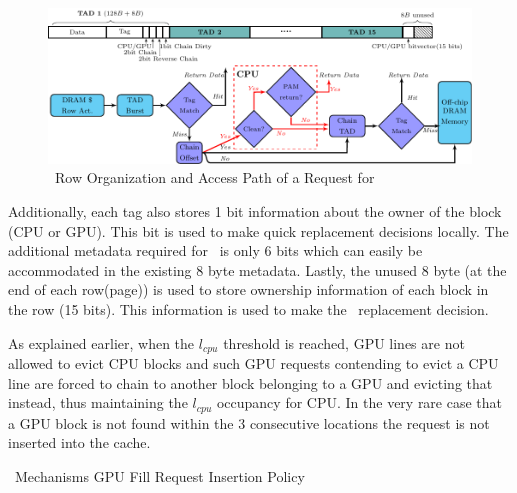 \begin{figure}[htb]
	\centering
	\includegraphics[scale=0.96]{figures/chaining}
	\caption{\cachename\ Row Organization and Access Path of a Request for \chaining}	
	\label{fig:chain-access}
\end{figure}

Additionally, each tag also stores 1 bit information about the owner of the block (CPU or GPU). This bit is used to make quick replacement decisions locally. The additional metadata required for \chaining\ is only 6 bits which can easily be accommodated in the existing 8 byte metadata. Lastly, the unused 8 byte (at the end of each row(page)) is used to store ownership information of each block in the row (15 bits). This information is used to make the \chaining\ replacement decision.


\par As explained earlier, when the \textit{$l_{cpu}$} threshold is reached, GPU lines are not allowed to evict CPU blocks and such GPU requests contending to evict a CPU line are forced to chain to another block belonging to a GPU and evicting that instead, thus maintaining the \textit{$l_{cpu}$} occupancy for CPU. In the very rare case that a GPU block is not found within the 3 consecutive locations the request is not inserted into the cache.

\begin{table}[htb]
	\centering
	
	\caption{\chaining\ Mechanisms GPU Fill Request Insertion Policy}
	\label{chaining-replacement}
\end{table}

